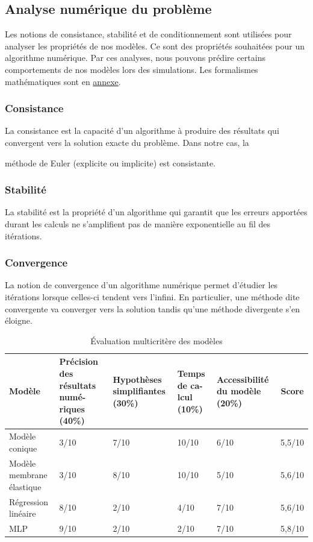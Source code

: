 \documentclass[
	a4paper, %
	10pt, %
	unnumberedsections, %
	twoside, %
]{LTJournalArticle}
\begin{document}
\subsection{Analyse numérique du problème}
\label{sec:ananum}

Les notions de consistance, stabilité et de conditionnement sont utilisées pour analyser 
les propriétés de nos modèles. Ce sont des propriétés souhaitées pour un algorithme numérique.
Par ces analyses, nous pouvons prédire certains comportements de nos modèles lors des simulations. Les formalismes mathématiques sont en \hyperref[annex:ananum]{annexe}.

\subsubsection{Consistance}
La consistance est la capacité d'un algorithme à produire des résultats qui convergent 
vers la solution exacte du problème. Dans notre cas, la 

\noindent méthode de Euler (explicite ou implicite) est consistante.

\subsubsection{Stabilité}
La stabilité est la propriété d'un algorithme qui garantit que les erreurs apportées durant les calculs ne s'amplifient pas de manière exponentielle au fil des itérations.


\subsubsection{Convergence}
La notion de convergence d'un algorithme numérique permet d'étudier les itérations lorsque celles-ci tendent vers l'infini. En particulier, une méthode dite convergente va
converger vers la solution tandis qu'une méthode divergente s'en éloigne.

\begin{table}[!t]
    \centering
    \small
    \begin{tabular}{|l|p{2.5cm}|p{2.5cm}|p{1.8cm}|p{2.5cm}|c|}
        \hline
        \textbf{Modèle} & 
        \textbf{Précision des résultats numé-riques (40\%)} & 
        \textbf{Hypothèses simplifiantes (30\%)} & 
        \textbf{Temps de ca-lcul (10\%)} & 
        \textbf{Accessibilité du modèle (20\%)} & 
        \textbf{Score} \\ 
        \hline
        Modèle conique & 3/10 & 7/10 & 10/10 & 6/10 & 5,5/10 \\
        \hline
        Modèle membrane élastique & 3/10 & 8/10 & 10/10 & 5/10 & 5,6/10 \\
        \hline
        Régression linéaire & 8/10 & 2/10 & 4/10 & 7/10 & 5,6/10 \\
        \hline
        MLP & 9/10 & 2/10 & 2/10 & 7/10 & 5,8/10 \\
        \hline
    \end{tabular}
    \caption{Évaluation multicritère des modèles}
    \label{tab:multicritere}
\end{table}
\FloatBarrier
\end{document}
